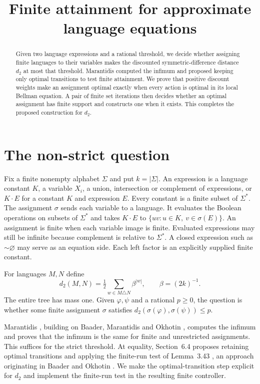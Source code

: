 \documentclass[11pt,a4paper]{amsart}
\title{Finite attainment for approximate language equations}
\date{}
\begin{document}
\begin{abstract}
Given two language expressions and a rational threshold, we decide whether assigning finite languages to their variables makes the discounted symmetric-difference distance \(d_2\) at most that threshold. Marantidis computed the infimum and proposed keeping only optimal transitions to test finite attainment. We prove that positive discount weights make an assignment optimal exactly when every action is optimal in its local Bellman equation. A pair of finite set iterations then decides whether an optimal assignment has finite support and constructs one when it exists. This completes the proposed construction for \(d_2\).
\end{abstract}
\maketitle

\section{The non-strict question}
Fix a finite nonempty alphabet \(\Sigma\) and put \(k=|\Sigma|\). An expression is a language constant \(K\), a variable \(X_i\), a union, intersection or complement of expressions, or \(K\cdot E\) for a constant \(K\) and expression \(E\). Every constant is a finite subset of \(\Sigma^*\). The assignment \(\sigma\) sends each variable to a language. It evaluates the Boolean operations on subsets of \(\Sigma^*\) and takes \(K\cdot E\) to \(\{uv:u\in K,\ v\in\sigma(E)\}\). An assignment is finite when each variable image is finite. Evaluated expressions may still be infinite because complement is relative to \(\Sigma^*\). A closed expression such as \(\sim\varnothing\) may serve as an equation side. Each left factor is an explicitly supplied finite constant.

For languages \(M,N\) define
\[
 d_2(M,N)=\tfrac12\sum_{w\in M\triangle N}\beta^{|w|},
 \qquad \beta=(2k)^{-1}.
\]
The entire tree has mass one. Given \(\varphi,\psi\) and a rational \(p\ge0\), the question is whether some finite assignment \(\sigma\) satisfies \(d_2(\sigma(\varphi),\sigma(\psi))\le p\).

Marantidis \cite[Sections~6.2--6.3]{marantidis}, building on Baader, Marantidis and Okhotin \cite{bmo}, computes the infimum and proves that the infimum is the same for finite and unrestricted assignments. This suffices for the strict threshold. At equality, Section~6.4 proposes retaining optimal transitions and applying the finite-run test of Lemma~3.43 \cite{marantidis}, an approach originating in Baader and Okhotin \cite{bo}. We make the optimal-transition step explicit for \(d_2\) and implement the finite-run test in the resulting finite controller.
\end{document}
